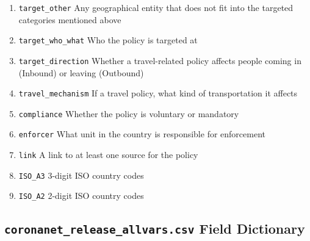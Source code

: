 \documentclass[]{article}
\begin{document}
\begin{enumerate}
\item
  \texttt{target\_other} Any geographical entity that does not fit into the targeted categories mentioned above
\item
  \texttt{target\_who\_what} Who the policy is targeted at
\item
  \texttt{target\_direction} Whether a travel-related policy affects people coming in (Inbound) or leaving (Outbound)
\item
  \texttt{travel\_mechanism} If a travel policy, what kind of transportation it affects
\item
  \texttt{compliance} Whether the policy is voluntary or mandatory
\item
  \texttt{enforcer} What unit in the country is responsible for enforcement
\item
  \texttt{link} A link to at least one source for the policy
\item
  \texttt{ISO\_A3} 3-digit ISO country codes
\item
  \texttt{ISO\_A2} 2-digit ISO country codes
\end{enumerate}

\hypertarget{coronanet_release_allvars.csv-field-dictionary}{%
\subsection*{\texorpdfstring{\texttt{coronanet\_release\_allvars.csv} Field Dictionary}{coronanet\_release\_allvars.csv Field Dictionary}}\label{coronanet_release_allvars.csv-field-dictionary}}
\end{document}
